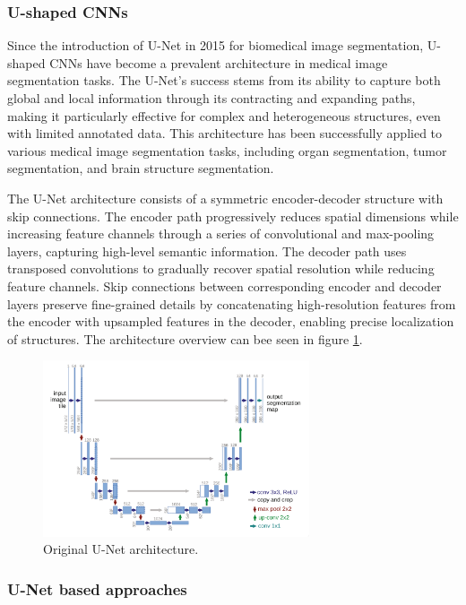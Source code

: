\subsubsection{U-shaped \gls{CNN}s}
Since the introduction of U-Net \cite{RonnebergerEtAl2015} in 2015
for biomedical image segmentation, U-shaped \gls{CNN}s have become a
prevalent architecture in medical image segmentation tasks. The
U-Net's success stems from its ability to capture both global and
local information through its contracting and expanding paths, making
it particularly effective for complex and heterogeneous structures,
even with limited annotated data. This architecture has been
successfully applied to various medical image segmentation tasks,
including organ segmentation, tumor segmentation, and brain structure
segmentation.

The U-Net architecture consists of a symmetric encoder-decoder
structure with skip connections. The encoder path progressively
reduces spatial dimensions while increasing feature channels through
a series of convolutional and max-pooling layers, capturing
high-level semantic information. The decoder path uses transposed
convolutions to gradually recover spatial resolution while reducing
feature channels. Skip connections between corresponding encoder and
decoder layers preserve fine-grained details by concatenating
high-resolution features from the encoder with upsampled features in
the decoder, enabling precise localization of structures. The
architecture overview can bee seen in figure \ref{fig:unet_architecture}.

\begin{figure}[h]
  \centering
  \includegraphics[width=0.7\textwidth]{Cap1/Figures/unet_architecture.png}
  \caption{Original U-Net architecture.}
  \label{fig:unet_architecture}
\end{figure}

\subsubsection{U-Net based approaches}

